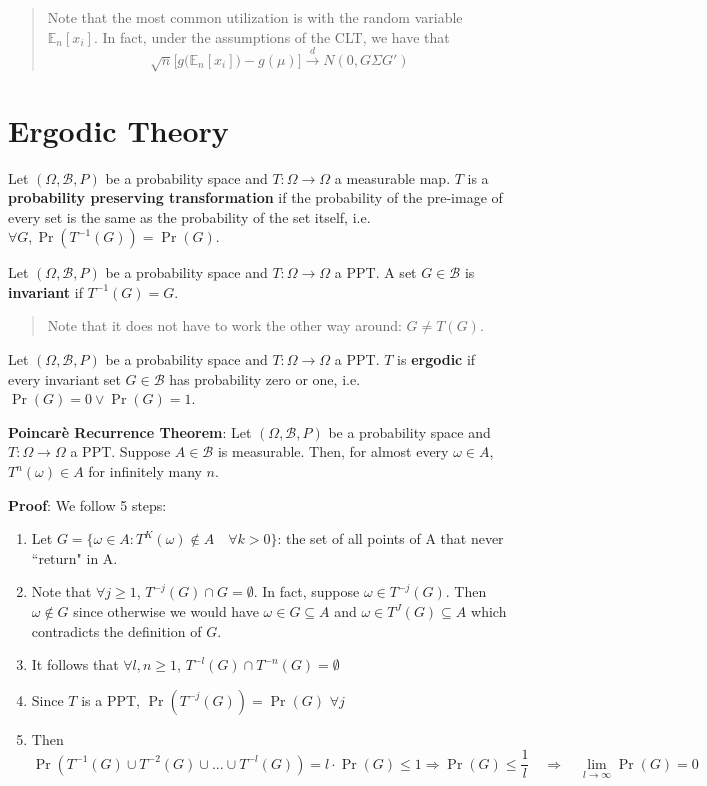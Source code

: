 \documentclass[12pt,]{book}
\providecommand{\tightlist}{%
  \setlength{\itemsep}{0pt}\setlength{\parskip}{0pt}}
\begin{document}
\begin{quote}
Note that the most common utilization is with the random variable \(\mathbb E_n [x_i]\). In fact, under the assumptions of the CLT, we have that
\[
\sqrt{n} \Big[ g \big( \mathbb E_n [x_i] \big) - g(\mu) \Big] \overset{d}{\to} N(0, G \Sigma G')
\]
\end{quote}

\hypertarget{ergodic-theory}{%
\section{Ergodic Theory}\label{ergodic-theory}}

Let \((\Omega, \mathcal{B}, P)\) be a probability space and \(T: \Omega \rightarrow \Omega\) a measurable map. \(T\) is a \textbf{probability preserving transformation} if the probability of the pre-image of every set is the same as the probability of the set itself, i.e.~\(\forall G, \Pr(T^{-1}(G)) = \Pr(G)\).

Let \((\Omega, \mathcal{B}, P)\) be a probability space and \(T: \Omega \rightarrow \Omega\) a PPT. A set \(G \in \mathcal{B}\) is \textbf{invariant} if \(T^{-1}(G)=G\).

\begin{quote}
Note that it does not have to work the other way around: \(G \neq T(G)\).
\end{quote}

Let \((\Omega, \mathcal{B}, P)\) be a probability space and \(T: \Omega \rightarrow \Omega\) a PPT. \(T\) is \textbf{ergodic} if every invariant set \(G \in \mathcal{B}\) has probability zero or one, i.e.~\(\Pr(G) = 0 \lor \Pr(G) = 1\).

\textbf{Poincarè Recurrence Theorem}:
Let \((\Omega, \mathcal{B}, P)\) be a probability space and \(T: \Omega \rightarrow \Omega\) a PPT. Suppose \(A \in \mathcal{B}\) is measurable. Then, for almost every \(\omega \in A\), \(T^n(\omega)\in A\) for infinitely many \(n\).

\textbf{Proof}:
We follow 5 steps:

\begin{enumerate}
\def\labelenumi{\arabic{enumi}.}
\tightlist
\item
  Let \(G = \{ \omega \in A : T^K(\omega) \notin A \quad \forall k >0 \}\): the set of all points of A that never ``return" in A.
\item
  Note that \(\forall j \geq 1\), \(T^{-j}(G) \cap G = \emptyset\). In fact, suppose \(\omega \in T^{-j}(G)\). Then \(\omega \notin G\) since otherwise we would have \(\omega \in G \subseteq A\) and \(\omega \in T^J(G) \subseteq A\) which contradicts the definition of \(G\).
\item
  It follows that \(\forall l,n \geq 1\), \(T^{-l}(G) \cap T^{-n}(G) = \emptyset\)
\item
  Since \(T\) is a PPT, \(\Pr(T^{-j}(G)) = \Pr(G)\) \(\forall j\)
\item
  Then
  \[
       \Pr (T^{-1}(G) \cup T^{-2}(G) \cup ... \cup T^{-l}(G)) = l \cdot \Pr(G) \leq 1 \Rightarrow \Pr(G) \leq \frac{1}{l} \quad \Rightarrow \quad \lim_ {l \to \infty} \Pr(G) = 0 
  \]
  \[\tag*{$\blacksquare$}\]
\end{enumerate}
\end{document}
